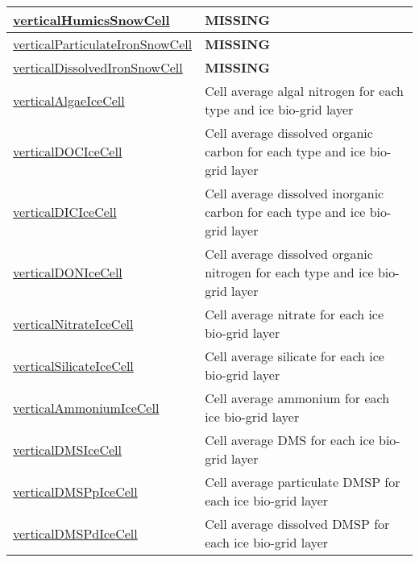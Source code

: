 {\begin{center}
\begin{longtable}{| p{2.0in} | p{4.0in} |}
    \hline
    \hyperref[subsec:var_sec_tracers_aggregate_verticalHumicsSnowCell]{verticalHumicsSnowCell} & {\bf \color{red} MISSING} \\
    \hline
    \hyperref[subsec:var_sec_tracers_aggregate_verticalParticulateIronSnowCell]{verticalParticulateIronSnowCell} & {\bf \color{red} MISSING} \\
    \hline
    \hyperref[subsec:var_sec_tracers_aggregate_verticalDissolvedIronSnowCell]{verticalDissolvedIronSnowCell} & {\bf \color{red} MISSING} \\
    \hline
    \hyperref[subsec:var_sec_tracers_aggregate_verticalAlgaeIceCell]{verticalAlgaeIceCell} & Cell average algal nitrogen for each type and ice bio-grid layer \\
    \hline
    \hyperref[subsec:var_sec_tracers_aggregate_verticalDOCIceCell]{verticalDOCIceCell} & Cell average dissolved organic carbon for each type and ice bio-grid layer \\
    \hline
    \hyperref[subsec:var_sec_tracers_aggregate_verticalDICIceCell]{verticalDICIceCell} & Cell average dissolved inorganic carbon for each type and ice bio-grid layer \\
    \hline
    \hyperref[subsec:var_sec_tracers_aggregate_verticalDONIceCell]{verticalDONIceCell} & Cell average dissolved organic nitrogen for each type and ice bio-grid layer \\
    \hline
    \hyperref[subsec:var_sec_tracers_aggregate_verticalNitrateIceCell]{verticalNitrateIceCell} & Cell average nitrate for each ice bio-grid layer \\
    \hline
    \hyperref[subsec:var_sec_tracers_aggregate_verticalSilicateIceCell]{verticalSilicateIceCell} & Cell average silicate for each ice bio-grid layer \\
    \hline
    \hyperref[subsec:var_sec_tracers_aggregate_verticalAmmoniumIceCell]{verticalAmmoniumIceCell} & Cell average ammonium for each ice bio-grid layer \\
    \hline
    \hyperref[subsec:var_sec_tracers_aggregate_verticalDMSIceCell]{verticalDMSIceCell} & Cell average DMS for each ice bio-grid layer \\
    \hline
    \hyperref[subsec:var_sec_tracers_aggregate_verticalDMSPpIceCell]{verticalDMSPpIceCell} & Cell average particulate DMSP for each ice bio-grid layer \\
    \hline
    \hyperref[subsec:var_sec_tracers_aggregate_verticalDMSPdIceCell]{verticalDMSPdIceCell} & Cell average dissolved DMSP for each ice bio-grid layer \\

\end{longtable}
\end{center}}
